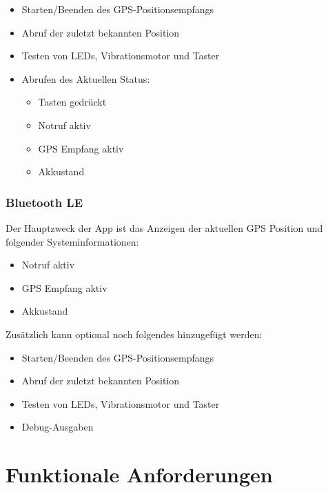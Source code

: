 \begin{itemize}
	\item Starten/Beenden des GPS-Positionsempfangs
	\item Abruf der zuletzt bekannten Position
	\item Testen von LEDs, Vibrationsmotor und Taster
	\item Abrufen des Aktuellen Status:
	\begin{itemize}
		\item Tasten gedrückt
		\item Notruf aktiv
		\item GPS Empfang aktiv
		\item Akkustand
	\end{itemize}
\end{itemize}

\subsubsection{Bluetooth LE}

Der Hauptzweck der App ist das Anzeigen der aktuellen GPS Position und folgender Systeminformationen:
\begin{itemize}
	\item Notruf aktiv
	\item GPS Empfang aktiv
	\item Akkustand
\end{itemize}

Zusätzlich kann optional noch folgendes hinzugefügt werden:

\begin{itemize}
	\item Starten/Beenden des GPS-Positionsempfangs
	\item Abruf der zuletzt bekannten Position
	\item Testen von LEDs, Vibrationsmotor und Taster
	\item Debug-Ausgaben
\end{itemize}

\newpage

\section{Funktionale Anforderungen}
